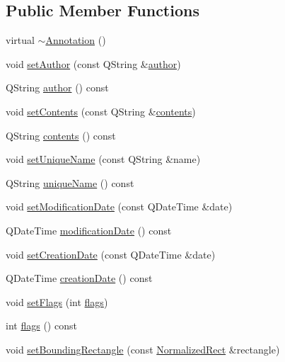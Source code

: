 \subsection*{Public Member Functions}
\begin{DoxyCompactItemize}
\item 
virtual \hyperlink{classOkular_1_1Annotation_a95144855eb445040d47951c668dc5764}{$\sim$\+Annotation} ()
\item 
void \hyperlink{classOkular_1_1Annotation_ac67827a495bc3ca9fc91c82590c7bf35}{set\+Author} (const Q\+String \&\hyperlink{classOkular_1_1Annotation_a45682b53c24e4f5d41c547d6e109f6a4}{author})
\item 
Q\+String \hyperlink{classOkular_1_1Annotation_a45682b53c24e4f5d41c547d6e109f6a4}{author} () const 
\item 
void \hyperlink{classOkular_1_1Annotation_a65a7316062031c6fdf578835245ddbd1}{set\+Contents} (const Q\+String \&\hyperlink{classOkular_1_1Annotation_a3b0c9fcbe9d01e06bfcc7216d0035908}{contents})
\item 
Q\+String \hyperlink{classOkular_1_1Annotation_a3b0c9fcbe9d01e06bfcc7216d0035908}{contents} () const 
\item 
void \hyperlink{classOkular_1_1Annotation_a9a9c80155d92ff897450e4a06f84d7f1}{set\+Unique\+Name} (const Q\+String \&name)
\item 
Q\+String \hyperlink{classOkular_1_1Annotation_a8a86ff8c722014c2296112d0fa703eab}{unique\+Name} () const 
\item 
void \hyperlink{classOkular_1_1Annotation_a1ea7e94039a7dc3dce500ae96817b30d}{set\+Modification\+Date} (const Q\+Date\+Time \&date)
\item 
Q\+Date\+Time \hyperlink{classOkular_1_1Annotation_a4bee8f09724539e15f435b643049f2c1}{modification\+Date} () const 
\item 
void \hyperlink{classOkular_1_1Annotation_a7b8e97b104dc0b8cd8ff95253d95e167}{set\+Creation\+Date} (const Q\+Date\+Time \&date)
\item 
Q\+Date\+Time \hyperlink{classOkular_1_1Annotation_ad775b0d2925d50334d46efc1a2689e5b}{creation\+Date} () const 
\item 
void \hyperlink{classOkular_1_1Annotation_ab91b36dc7ecfd9cacba7761ec58145fd}{set\+Flags} (int \hyperlink{classOkular_1_1Annotation_a3d6f7ee5057155b90e76c24768880947}{flags})
\item 
int \hyperlink{classOkular_1_1Annotation_a3d6f7ee5057155b90e76c24768880947}{flags} () const 
\item 
void \hyperlink{classOkular_1_1Annotation_a6977075c78f130b71ddbbda924480f38}{set\+Bounding\+Rectangle} (const \hyperlink{classOkular_1_1NormalizedRect}{Normalized\+Rect} \&rectangle)

\end{DoxyCompactItemize}
